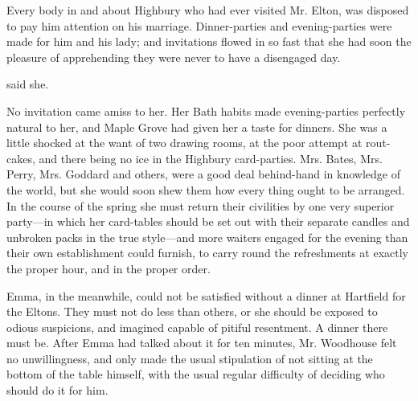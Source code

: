 Every body in and about Highbury who had ever visited Mr. Elton, was disposed to pay him attention on his marriage. Dinner-parties and evening-parties were made for him and his lady; and invitations flowed in so fast that she had soon the pleasure of apprehending they were never to have a disengaged day.

 said she. 

No invitation came amiss to her. Her Bath habits made evening-parties perfectly natural to her, and Maple Grove had given her a taste for dinners. She was a little shocked at the want of two drawing rooms, at the poor attempt at rout-cakes, and there being no ice in the Highbury card-parties. Mrs. Bates, Mrs. Perry, Mrs. Goddard and others, were a good deal behind-hand in knowledge of the world, but she would soon shew them how every thing ought to be arranged. In the course of the spring she must return their civilities by one very superior party---in which her card-tables should be set out with their separate candles and unbroken packs in the true style---and more waiters engaged for the evening than their own establishment could furnish, to carry round the refreshments at exactly the proper hour, and in the proper order.

Emma, in the meanwhile, could not be satisfied without a dinner at Hartfield for the Eltons. They must not do less than others, or she should be exposed to odious suspicions, and imagined capable of pitiful resentment. A dinner there must be. After Emma had talked about it for ten minutes, Mr. Woodhouse felt no unwillingness, and only made the usual stipulation of not sitting at the bottom of the table himself, with the usual regular difficulty of deciding who should do it for him.

